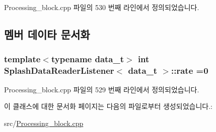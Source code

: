 Processing\+\_\+block.\+cpp 파일의 530 번째 라인에서 정의되었습니다.



\subsection{멤버 데이타 문서화}
\subsubsection[{\texorpdfstring{rate}{rate}}]{\setlength{\rightskip}{0pt plus 5cm}template$<$typename data\+\_\+t$>$ int {\bf Splash\+Data\+Reader\+Listener}$<$ data\+\_\+t $>$\+::rate =0}\hypertarget{classSplashDataReaderListener_a04a00555f4d589983e0a82ea33a4b705}{}\label{classSplashDataReaderListener_a04a00555f4d589983e0a82ea33a4b705}


Processing\+\_\+block.\+cpp 파일의 529 번째 라인에서 정의되었습니다.



이 클래스에 대한 문서화 페이지는 다음의 파일로부터 생성되었습니다.\+:\begin{DoxyCompactItemize}
\item 
src/\hyperlink{Processing__block_8cpp}{Processing\+\_\+block.\+cpp}\end{DoxyCompactItemize}
